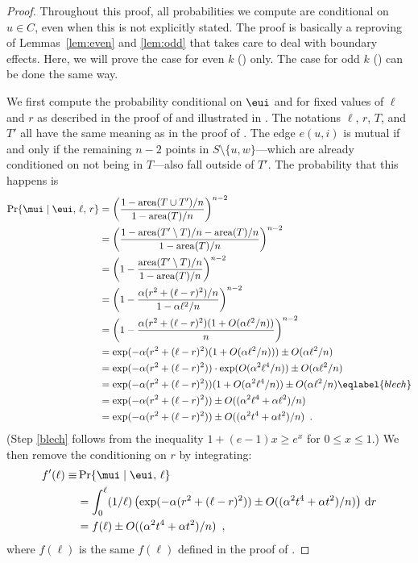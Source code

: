 \documentclass{patmorin}
\DeclareMathOperator{\area}{area}
\begin{document}
\begin{proof}
Throughout this proof, all probabilities we compute are conditional on
$u\in C$, even when this is not explicitly stated.  The proof is basically
a reproving of Lemmas~\ref{lem:even} and \ref{lem:odd} that takes care to
deal with boundary effects.  Here, we will prove the case for even $k$
() only.  The case for odd $k$ () can be done
the same way.

We first compute the probability conditional on $\eui$ and for fixed
values of $\ell$ and $r$ as described in the proof of 
and illustrated in .  The notations $\ell$, $r$, $T$,
and $T'$ all have the same meaning as in the proof of .
The edge $e(u,i)$ is mutual if and only if the remaining $n-2$ points
in $S\setminus\{u,w\}$---which are already conditioned on not being in
$T$---also fall outside of $T'$.  The probability that this happens is
\begin{align}
   \Pr\{\mui\mid\eui,\,\ell,\, r\}
        & = \left(\frac{1-\area(T\cup T')/n}{1-\area(T)/n}\right)^{n-2} 
		\notag \\
        & = \left(\frac{1-\area(T'\setminus T)/n - \area(T)/n}
             {1-\area(T)/n}\right)^{n-2} \notag \\
        & = \left(1-\frac{\area(T'\setminus T)/n}{1-\area(T)/n}\right)^{n-2}
		\notag  \\
        & = \left(1-\frac{\alpha(r^2+(\ell-r)^2)/n}
                       {1-\alpha\ell^2/n}\right)^{n-2} \notag \\
        & = \left(1-\frac{\alpha(r^2+(\ell-r)^2)
               (1+O(\alpha\ell^2/n))}{n} \right)^{n-2} \notag \\
        & = \exp(-\alpha(r^2+(\ell-r)^2)(1+O(\alpha\ell^2/n)))
         \pm O(\alpha\ell^2/n) \notag \\
        & = \exp(-\alpha(r^2+(\ell-r)^2))
            \cdot\exp(O(\alpha^2\ell^4/n)) \pm O(\alpha\ell^2/n) \notag \\
        & = \exp(-\alpha(r^2+(\ell-r)^2))(1+O(\alpha^2\ell^4/n)) 
            \pm O(\alpha\ell^2/n) \eqlabel{blech} \\
        & = \exp(-\alpha(r^2+(\ell-r)^2))
            \pm O((\alpha^2\ell^4+\alpha\ell^2)/n) \notag \\
        & = \exp(-\alpha(r^2+(\ell-r)^2))
            \pm O((\alpha^2 t^4+\alpha t^2)/n) \enspace . \notag
\end{align}
(Step \eqref{blech} follows from the inequality $1+(e-1)x \ge e^{x}$
for $0\le x\le 1$.)  We then remove the conditioning on $r$ by integrating:
\begin{align*}
   f'(\ell) \equiv & \Pr\{\mui\mid\eui,\,\ell\} \\
     & = \int_0^\ell(1/\ell)\left(\exp(-\alpha(r^2+(\ell-r)^2)) 
           \pm O((\alpha^2 t^4+\alpha t^2)/n)\right)\,\mathrm{d}r \\
     & = f(\ell) \pm O((\alpha^2 t^4+\alpha t^2)/n) \enspace ,
\end{align*}
where $f(\ell)$ is the same $f(\ell)$ defined in the proof of .


\end{proof}
\end{document}

